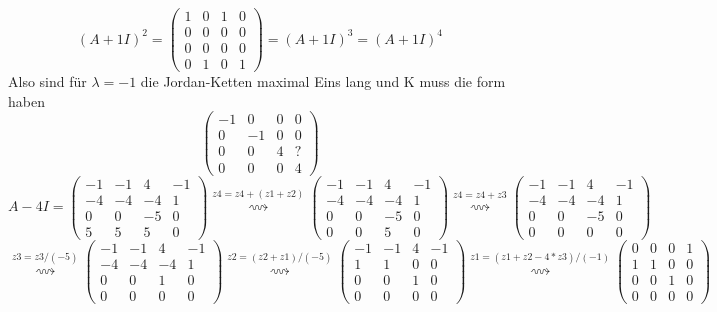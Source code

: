 \documentclass{article} %
\begin{document}
\[
(A +1 I)^2 = \begin{pmatrix}
1 & 0 & 1 & 0 \\
0 & 0 & 0 & 0 \\
0 & 0 & 0 & 0 \\
0 & 1 & 0 & 1
\end{pmatrix} = (A +1 I)^3 = (A +1 I)^4
\]
Also sind für $\lambda = -1$ die Jordan-Ketten maximal Eins lang und K muss die form haben 
\[
\begin{pmatrix}
-1&0&0&0\\
0&-1&0&0\\
0&0&4&?\\
0&0&0&4
\end{pmatrix}
\]
\[
A -4 I = \begin{pmatrix}
-1 & -1 & 4 & -1 \\
-4 & -4 & -4 & 1 \\
0 & 0 & -5 & 0 \\
5 & 5 & 5 & 0
\end{pmatrix} \overset{z4 = z4 + (z1+z2)}{\rightsquigarrow}
\begin{pmatrix}
-1 & -1 & 4 & -1 \\
-4 & -4 & -4 & 1 \\
0 & 0 & -5 & 0 \\
0 & 0 & 5 & 0
\end{pmatrix} \overset{z4=z4+z3}{\rightsquigarrow}
\begin{pmatrix}
-1 & -1 & 4 & -1 \\
-4 & -4 & -4 & 1 \\
0 & 0 & -5 & 0 \\
0 & 0 & 0 & 0
\end{pmatrix} 
\]
\[
 \overset{z3=z3/(-5)}{\rightsquigarrow}
\begin{pmatrix}
-1 & -1 & 4 & -1 \\
-4 & -4 & -4 & 1 \\
0 & 0 & 1 & 0 \\
0 & 0 & 0 & 0
\end{pmatrix} \overset{z2=(z2+z1)/(-5)}{\rightsquigarrow}
\begin{pmatrix}
-1 & -1 & 4 & -1 \\
1 & 1 & 0 & 0 \\
0 & 0 & 1 & 0 \\
0 & 0 & 0 & 0
\end{pmatrix} 
\overset{z1 = (z1+z2-4*z3)/(-1)}{\rightsquigarrow}
\begin{pmatrix}
0 & 0 & 0 & 1 \\
1 & 1 & 0 & 0 \\
0 & 0 & 1 & 0 \\
0 & 0 & 0 & 0
\end{pmatrix} 
\]
\end{document}
